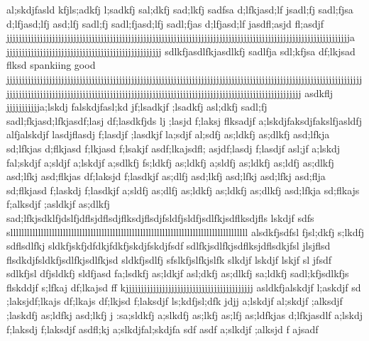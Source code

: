 al;skdjfasld kfjls;adkfj l;sadkfj sal;dkfj sad;lkfj sadfsa d;lfkjasd;lf jsadl;fj sadl;fjsa d;lfjasd;lfj asd;lfj sadl;fj sadl;fjasd;lfj sadl;fjas d;lfjasd;lf jasdfl;asjd fl;asdjf   jjjjjjjjjjjjjjjjjjjjjjjjjjjjjjjjjjjjjjjjjjjjjjjjjjjjjjjjjjjjjjjjjjjjjjjjjjjjjjjjjjjjjjjjjjjjjjjjjjjjjjjjjjjjjjjjja         jjjjjjjjjjjjjjjjjjjjjjjjjjjjjjjjjjjjjjjjjjjjjjjjjjj                                                                                                                                               sdlkfjasdlfkjasdlkfj sadlfja sdl;kfjsa df;lkjsad flksd spankiing good jjjjjjjjjjjjjjjjjjjjjjjjjjjjjjjjjjjjjjjjjjjjjjjjjjjjjjjjjjjjjjjjjjjjjjjjjjjjjjjjjjjjjjjjjjjjjjjjjjjjjjjjjjjjjjjjjjjjjjjjjjjjjjjjjjjjjjjjjjjjjjjjjjjjjjjjjjjjjjjjjjjjjjjjjjjjjjjjjjjjjjjjjjjjjjjjjjjjjjjjjjjjjjjjjjjjjj                                                                                                          asdkflj jjjjjjjjjjja;lskdj falskdjfasl;kd jf;lsadkjf ;lsadkfj asl;dkfj sadl;fj sadl;fkjasd;lfkjasdf;lasj df;lasdkfjds lj ;lasjd f;laksj flksadjf                                                                        a;lskdjfaksdjfakslfjasldfj alfjalskdjf lasdjflasdj f;lasdjf ;lasdkjf la;sdjf al;sdfj as;ldkfj as;dlkfj asd;lfkja sd;lfkjas d;flkjasd f;lkjasd f;lsakjf                                                                          asdf;lkajsdfl; asjdf;lasdj f;lasdjf asl;jf                                                                              a;lskdj fal;skdjf a;sldjf a;lskdjf a;sdlkfj fs;ldkfj as;ldkfj a;sldfj as;ldkfj as;ldfj as;dlkfj asd;lfkj asd;flkjas df;laksjd f;lasdkjf as;dlfj asd;lkfj asd;lfkj asd;lfkj asd;flja sd;flkjasd f;laskdj f;lasdkjf a;sldfj as;dlfj as;ldkfj as;ldkfj as;dlkfj asd;lfkja sd;flkajs f;alksdjf ;asldkjf as;dlkfj sad;lfkjsdklfjdslfjdflsjdflsdjflksdjflsdjfsldfjsldfjsdlfkjsdflksdjfls lskdjf sdfs sllllllllllllllllllllllllllllllllllllllllllllllllllllllllllllllllllllllllllllllllllllll                                                                         alsdkfjsdfsl fjsl;dkfj s;lkdfj sdflsdlfkj                                                                      sldkfjskfjdfdkjfdkfjskdjfskdjfsdf                                               sdlfkjsdlfkjsdflksjdflsdkjfsl jlsjflsd flsdkdjfsldkfjsdlfkjsdlfkjsd sldkfjsdlfj                                                                     sfslkfjslfkjslfk slkdjf lskdjf lskjf sl jfsdf                                                                           sdlkfjsl dfjsldkfj sldfjasd fa;lsdkfj as;ldkjf asl;dkfj as;dlkfj sa;ldkfj sadl;kfjsdlkfjs flskddjf s;lfkaj df;lkajsd ff kjjjjjjjjjjjjjjjjjjjjjjjjjjjjjjjjjjjjjjjjjj                                                                                                                             asldkfjalskdjf l;askdjf sd                                                                              ;laksjdf;lkajs df;lkajs df;lkjsd f;laksdjf ls;kdfjsl;dfk jdjj                     a;lskdjf al;skdjf ;alksdjf ;laskdfj as;ldfkj asd;lkfj j                                                                                                                                                               :sa;sldkfj a;slkdfj as;lkfj as;lfj as;ldfkjas d;lfkjasdlf a;lskdj f;laksdj f;laksdjf asdfl;kj   a;slkdjfal;skdjfa sdf                               asdf a;slkdjf ;alksjd f                ajsadf                                                                                                       

